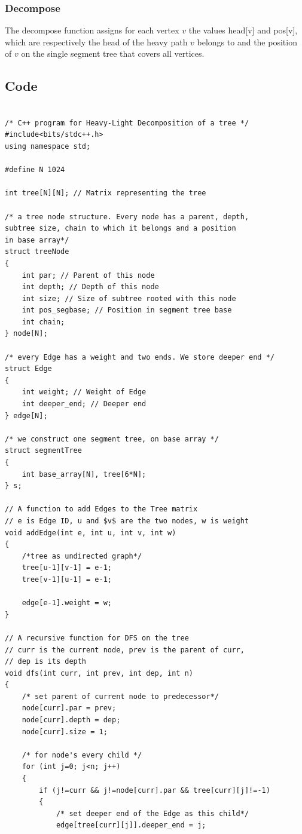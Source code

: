 \documentclass[12pt]{article}
\begin{document}
\subsubsection*{Decompose}
The decompose function assigns for each vertex $v$ the values head[v] and pos[v], which are respectively the head of the heavy path $v$ belongs to and the position of $v$ on the single segment tree that covers all vertices.


\newpage
\subsection{Code}
\begin{verbatim}

/* C++ program for Heavy-Light Decomposition of a tree */
#include<bits/stdc++.h> 
using namespace std; 

#define N 1024 

int tree[N][N]; // Matrix representing the tree 

/* a tree node structure. Every node has a parent, depth, 
subtree size, chain to which it belongs and a position 
in base array*/
struct treeNode 
{ 
	int par; // Parent of this node 
	int depth; // Depth of this node 
	int size; // Size of subtree rooted with this node 
	int pos_segbase; // Position in segment tree base 
	int chain; 
} node[N]; 

/* every Edge has a weight and two ends. We store deeper end */
struct Edge 
{ 
	int weight; // Weight of Edge 
	int deeper_end; // Deeper end 
} edge[N]; 

/* we construct one segment tree, on base array */
struct segmentTree 
{ 
	int base_array[N], tree[6*N]; 
} s; 

// A function to add Edges to the Tree matrix 
// e is Edge ID, u and $v$ are the two nodes, w is weight 
void addEdge(int e, int u, int v, int w) 
{ 
	/*tree as undirected graph*/
	tree[u-1][v-1] = e-1; 
	tree[v-1][u-1] = e-1; 

	edge[e-1].weight = w; 
} 

// A recursive function for DFS on the tree 
// curr is the current node, prev is the parent of curr, 
// dep is its depth 
void dfs(int curr, int prev, int dep, int n) 
{ 
	/* set parent of current node to predecessor*/
	node[curr].par = prev; 
	node[curr].depth = dep; 
	node[curr].size = 1; 

	/* for node's every child */
	for (int j=0; j<n; j++) 
	{ 
		if (j!=curr && j!=node[curr].par && tree[curr][j]!=-1) 
		{ 
			/* set deeper end of the Edge as this child*/
			edge[tree[curr][j]].deeper_end = j; 


\end{verbatim}
\end{document}
